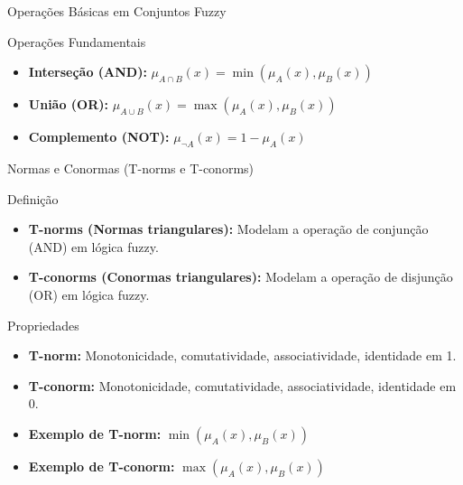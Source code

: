 \documentclass{beamer}
\begin{document}
\begin{frame}{Operações Básicas em Conjuntos Fuzzy}
\footnotesize
    \begin{block}{Operações Fundamentais}
        \begin{itemize}
            \item \textbf{Interseção (AND):} \( \mu_{A \cap B}(x) = \min(\mu_A(x), \mu_B(x)) \)
            \item \textbf{União (OR):} \( \mu_{A \cup B}(x) = \max(\mu_A(x), \mu_B(x)) \)
            \item \textbf{Complemento (NOT):} \( \mu_{\neg A}(x) = 1 - \mu_A(x) \)
        \end{itemize}
    \end{block}
    \centering
\end{frame}

\begin{frame}{Normas e Conormas (T-norms e T-conorms)}
\footnotesize
    \begin{block}{Definição}
        \begin{itemize}
            \item \textbf{T-norms (Normas triangulares):} Modelam a operação de conjunção (AND) em lógica fuzzy.
            \item \textbf{T-conorms (Conormas triangulares):} Modelam a operação de disjunção (OR) em lógica fuzzy.
        \end{itemize}
    \end{block}
    \pause
    \begin{block}{Propriedades}
        \begin{itemize}
            \item \textbf{T-norm:} Monotonicidade, comutatividade, associatividade, identidade em 1.
            \item \textbf{T-conorm:} Monotonicidade, comutatividade, associatividade, identidade em 0.
        \end{itemize}
    \end{block}
    \pause
    \centering
    \begin{itemize}
        \item \textbf{Exemplo de T-norm:} \( \min(\mu_A(x), \mu_B(x)) \)
        \item \textbf{Exemplo de T-conorm:} \( \max(\mu_A(x), \mu_B(x)) \)
    \end{itemize}
\end{frame}
\end{document}
